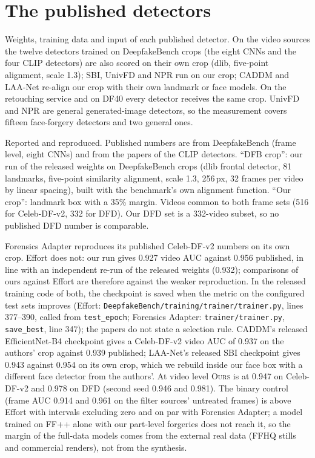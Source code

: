 \documentclass[10pt]{article}
\newcommand{\ours}{\textsc{Ours}}
\begin{document}
\section{The published detectors}
\label{sec:baselines}
\begin{table}[H]
\centering
\caption{Weights, training data and input of each published detector. On the video sources the twelve detectors trained on
DeepfakeBench crops (the eight CNNs and the four CLIP detectors) are also scored on their own crop (dlib, five-point alignment, scale 1.3); SBI,
UnivFD and NPR run on our crop; CADDM and LAA-Net re-align our crop with their own landmark or face models. On the retouching
service and on DF40 every detector receives the same crop. UnivFD and NPR are general generated-image detectors, so the
measurement covers fifteen face-forgery detectors and two general ones.}
\label{tab:baselines}
\footnotesize

\end{table}
\begin{table}[H]
\centering
\caption{Reported and reproduced. Published numbers are from DeepfakeBench (frame level, eight CNNs) and from the papers of the
CLIP detectors. ``DFB crop'': our run of the released weights on DeepfakeBench crops (dlib frontal detector, 81 landmarks,
five-point similarity alignment, scale 1.3, 256\,px, 32 frames per video by linear spacing), built with the benchmark's own
alignment function. ``Our crop'': landmark box with a 35\% margin. Videos common to both frame sets (516 for Celeb-DF-v2, 332 for
DFD). Our DFD set is a 332-video subset, so no published DFD number is comparable.}
\label{tab:reproduce}
\footnotesize
\begin{adjustbox}{max width=\linewidth}\end{adjustbox}
\end{table}
Forensics Adapter reproduces its published Celeb-DF-v2 numbers on its own crop. Effort does not: our run gives 0.927 video AUC
against 0.956 published, in line with an independent re-run of the released weights (0.932); comparisons of ours against
Effort are therefore against the weaker reproduction. In the released training code of both, the checkpoint is saved when the
metric on the configured test sets improves (Effort: \texttt{DeepfakeBench/training/trainer/trainer.py}, lines 377--390, called
from \texttt{test\_epoch}; Forensics Adapter: \texttt{trainer/trainer.py}, \texttt{save\_best}, line 347); the papers do not state a
selection rule. CADDM's released EfficientNet-B4 checkpoint gives a Celeb-DF-v2 video AUC of 0.937 on the authors' crop against
0.939 published; LAA-Net's released SBI checkpoint gives 0.943 against 0.954 on its own crop, which we rebuild inside our face
box with a different face detector from the authors'. At video level \ours{} is at 0.947 on Celeb-DF-v2 and 0.978 on DFD
(second seed 0.946 and 0.981). The binary control (frame AUC 0.914 and 0.961 on the filter sources' untreated frames) is above
Effort with intervals excluding zero and on par with Forensics Adapter; a model trained on FF++ alone with our part-level
forgeries does not reach it, so the margin of the full-data models comes from the external real data (FFHQ stills and commercial
renders), not from the synthesis.
\end{document}
